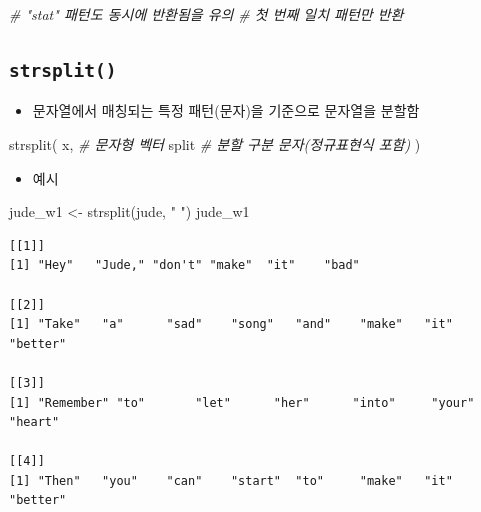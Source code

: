 \documentclass[
  11pt,
]{krantz}
\newenvironment{Shaded}{\begin{snugshade}}{\end{snugshade}}
\newcommand{\CommentTok}[1]{\textcolor[rgb]{0.37,0.37,0.37}{\textit{#1}}}
\newcommand{\FunctionTok}[1]{\textcolor[rgb]{0,0,0}{#1}}
\newcommand{\NormalTok}[1]{#1}
\newcommand{\OtherTok}[1]{\textcolor[rgb]{0.37,0.37,0.37}{#1}}
\newcommand{\StringTok}[1]{\textcolor[rgb]{0.5,0.5,0.5}{#1}}
\providecommand{\tightlist}{%
  \setlength{\itemsep}{0pt}\setlength{\parskip}{0pt}}
\begin{document}
\begin{Shaded}
\begin{Highlighting}[]
\CommentTok{\# "stat" 패턴도 동시에 반환됨을 유의}
\CommentTok{\# 첫 번째 일치 패턴만 반환}
\end{Highlighting}
\end{Shaded}

\normalsize

\hypertarget{strsplit}{%
\subsection{\texorpdfstring{\textbf{\texttt{strsplit()}}}{strsplit()}}\label{strsplit}}

\begin{itemize}
\tightlist
\item
  문자열에서 매칭되는 특정 패턴(문자)을 기준으로 문자열을 분할함
\end{itemize}

\footnotesize

\begin{Shaded}
\begin{Highlighting}[]
\FunctionTok{strsplit}\NormalTok{(}
\NormalTok{  x,    }\CommentTok{\# 문자형 벡터}
\NormalTok{  split }\CommentTok{\# 분할 구분 문자(정규표현식 포함)}
\NormalTok{)}
\end{Highlighting}
\end{Shaded}

\normalsize

\begin{itemize}
\tightlist
\item
  예시
\end{itemize}

\footnotesize

\begin{Shaded}
\begin{Highlighting}[]
\NormalTok{jude\_w1 }\OtherTok{\textless{}{-}} \FunctionTok{strsplit}\NormalTok{(jude, }\StringTok{" "}\NormalTok{)}
\NormalTok{jude\_w1}
\end{Highlighting}
\end{Shaded}

\begin{verbatim}
[[1]]
[1] "Hey"   "Jude," "don't" "make"  "it"    "bad"  

[[2]]
[1] "Take"   "a"      "sad"    "song"   "and"    "make"   "it"     "better"

[[3]]
[1] "Remember" "to"       "let"      "her"      "into"     "your"     "heart"   

[[4]]
[1] "Then"   "you"    "can"    "start"  "to"     "make"   "it"     "better"
\end{verbatim}
\end{document}
